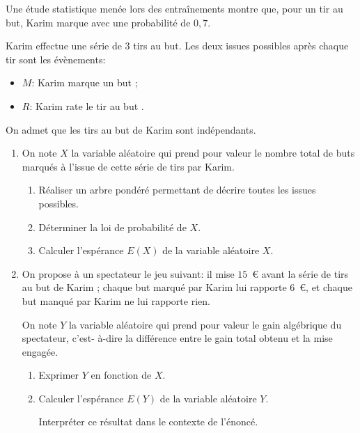 \medskip

Une étude statistique menée lors des entraînements montre que, pour un tir au but, Karim marque avec une probabilité de $0,7$.

Karim effectue une série de 3 tirs au but. Les deux issues possibles après chaque tir sont les évènements:

\setlength\parindent{1cm}
\begin{itemize}
\item[$\bullet~~$]$M$: \og Karim marque un but \fg{} ;
\item[$\bullet~~$]$R$: \og Karim rate le tir au but \fg.
\end{itemize}
\setlength\parindent{0cm}

On admet que les tirs au but de Karim sont indépendants.

\medskip

\begin{enumerate}
\item On note $X$ la variable aléatoire qui prend pour valeur le nombre total de buts marqués à l'issue de cette série de tirs par Karim.
	\begin{enumerate}
		\item Réaliser un arbre pondéré permettant de décrire toutes les issues possibles.	
		\item Déterminer la loi de probabilité de $X$.
		\item Calculer l'espérance $E(X)$ de la variable aléatoire $X$.
	\end{enumerate}
\item  On propose à un spectateur le jeu suivant: il mise $15$~\euro{} avant la série de tirs au but de Karim ; chaque but marqué par Karim lui rapporte $6$~\euro, et chaque but manqué par Karim ne lui rapporte rien.

On note $Y$ la variable aléatoire qui prend pour valeur le gain algébrique du spectateur, c'est- à-dire la différence entre le gain total obtenu et la mise engagée.
	\begin{enumerate}
		\item Exprimer $Y$ en fonction de $X$.
		\item Calculer l'espérance $E(Y)$ de la variable aléatoire $Y$. 

Interpréter ce résultat dans le contexte de l'énoncé.
	\end{enumerate}
\end{enumerate}
